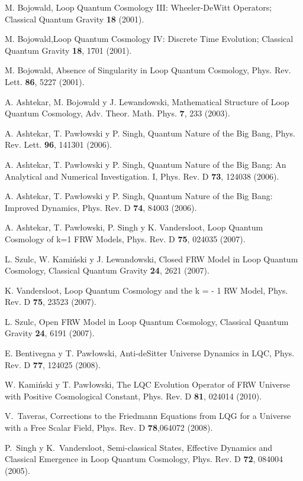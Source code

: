 \begin{thebibliography}{999}
 M. Bojowald, Loop Quantum Cosmology III: Wheeler-DeWitt Operators; Classical Quantum
Gravity {\bf18} (2001).

 M. Bojowald,Loop Quantum Cosmology IV: Discrete Time Evolution; Classical Quantum
Gravity {\bf18}, 1701 (2001). 

 M. Bojowald, Absence of Singularity in Loop Quantum Cosmology,
Phys. Rev. Lett. {\bf86}, 5227 (2001).

 A. Ashtekar, M. Bojowald y J. Lewandowski,  Mathematical Structure of Loop Quantum
Cosmology, Adv. Theor. Math. Phys. {\bf 7}, 233 (2003).

 A. Ashtekar, T. Paw{\l}owski y P. Singh, Quantum Nature of the Big Bang, Phys.
Rev. Lett. {\bf 96}, 141301 (2006).

  A. Ashtekar, T. Paw{\l}owski y P. Singh, Quantum Nature of the Big Bang: An
Analytical and Numerical
Investigation. I, Phys. Rev. D {\bf 73}, 124038 (2006).

 A. Ashtekar, T. Paw{\l}owski y P. Singh, Quantum Nature of the Big Bang: Improved
Dynamics, Phys. Rev. D {\bf 74}, 84003 (2006).

 A. Ashtekar, T. Paw{\l}owski, P. Singh y K. Vandersloot, Loop Quantum Cosmology of
k=1 FRW Models, Phys. Rev. D {\bf 75}, 024035 (2007).

 L. Szulc, W. Kami\'nski y J. Lewandowski, Closed FRW Model in Loop Quantum
Cosmology, Classical Quantum Gravity {\bf 24}, 2621 (2007).

 K. Vandersloot, Loop Quantum Cosmology and the k = - 1 RW Model, Phys. Rev. D {\bf
75}, 23523 (2007).

 L. Szulc, Open FRW Model in Loop Quantum Cosmology, Classical Quantum Gravity {\bf24},
6191
(2007).

 E. Bentivegna y T. Paw{\l}owski,  Anti-deSitter Universe Dynamics in LQC, 
Phys. Rev. D {\bf 77}, 124025 (2008).

 W. Kami\'nski y T. Paw{\l}owski, The LQC Evolution Operator of FRW Universe with
Positive
Cosmological Constant, Phys. Rev. D {\bf81}, 024014 (2010).

V.~Taveras, Corrections to the Friedmann Equations from LQG for a Universe with a Free Scalar Field,
Phys. Rev. D {\bf 78},064072 (2008).

P.~Singh y K.~Vandersloot, Semi-classical States, Effective Dynamics and Classical Emergence in
Loop Quantum Cosmology, Phys. Rev. D {\bf 72}, 084004 (2005).


\end{thebibliography}
